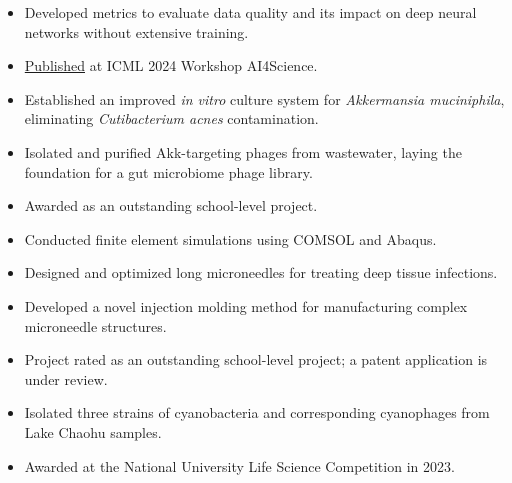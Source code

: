 \documentclass{resume}
\begin{document}
\begin{itemize}
  \item Developed metrics to evaluate data quality and its impact on deep neural networks without extensive training.
  \item \href{https://openreview.net/forum?id=kmAdBRaShI}{Published} at ICML 2024 Workshop AI4Science.
\end{itemize}

\begin{itemize}
  \item Established an improved \textit{in vitro} culture system for \textit{Akkermansia muciniphila}, eliminating \textit{Cutibacterium acnes} contamination.
  \item Isolated and purified Akk-targeting phages from wastewater, laying the foundation for a gut microbiome phage library.
  \item Awarded as an outstanding school-level project.
\end{itemize}

\begin{itemize}
  \item Conducted finite element simulations using COMSOL and Abaqus.
  \item Designed and optimized long microneedles for treating deep tissue infections.
  \item Developed a novel injection molding method for manufacturing complex microneedle structures.
  \item Project rated as an outstanding school-level project; a patent application is under review.
\end{itemize}

\begin{itemize}
  \item Isolated three strains of cyanobacteria and corresponding cyanophages from Lake Chaohu samples.
  \item Awarded at the National University Life Science Competition in 2023.
\end{itemize}
\end{document}
